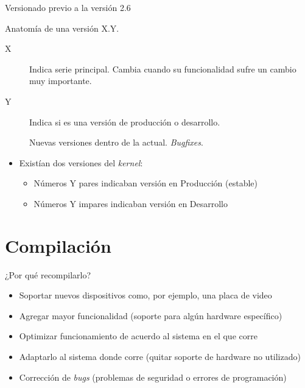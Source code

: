 \begin{frame}{Versionado previo a la versión 2.6}
  \begin{block}{Anatomía de una versión}
    \alert{X}.\alert{Y}.
  \end{block}
  \begin{description}

  \item[\alert{X}] Indica serie principal. Cambia cuando su funcionalidad
    sufre un cambio muy importante.

  \item[\alert{Y}] Indica si es una versión de producción o desarrollo.
  \item[] Nuevas versiones dentro de la
    actual. \textit{Bugfixes}.
  \end{description}
  \begin{itemize}
  \item Existían dos versiones del \textit{kernel}:
    \begin{itemize}
    \item Números \alert{Y} pares indicaban versión en Producción (estable)
    \item Números \alert{Y} impares indicaban versión en Desarrollo
    \end{itemize}    
  \end{itemize}
\end{frame}

\section{Compilación}
\begin{frame}{¿Por qué recompilarlo?}
\begin{itemize}
\item Soportar \alert{nuevos dispositivos} como, por ejemplo, una placa de
  video

\item Agregar \alert{mayor funcionalidad} (soporte para algún hardware
  específico)

\item Optimizar funcionamiento de acuerdo al \alert{sistema en el que
    corre}

\item \alert{Adaptarlo} al sistema donde corre (quitar soporte de hardware no utilizado)

\item \alert{Corrección} de \textit{bugs} (problemas de seguridad o errores de programación)
\end{itemize}
\end{frame}

